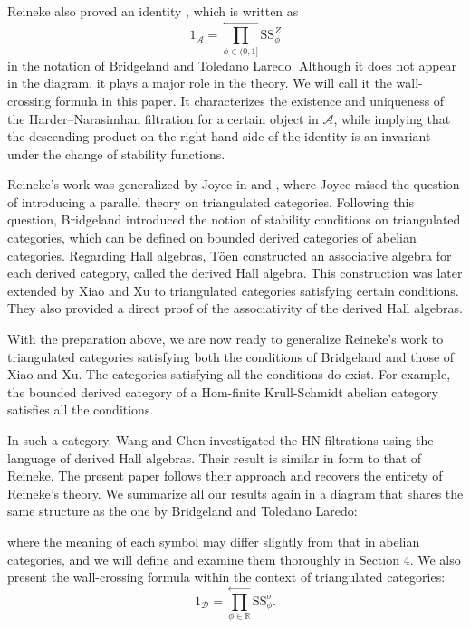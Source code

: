 \documentclass[a4paper,12pt]{amsart}
\newcommand{\Hom}{\mathrm{Hom}}
\newcommand{\Ss}{\mathrm{SS}}
\begin{document}
Reineke also proved an identity \cite[Proposition 4.12]{Rei2002}, which is written as
\[1_\mathcal{A}=\prod^\leftarrow_{\phi\in(0,1]}\Ss^Z_\phi\]
in the notation of Bridgeland and Toledano Laredo. Although it does not appear in the diagram, it plays a major role in the theory. We will call it the wall-crossing formula in this paper. It characterizes the existence and uniqueness of the Harder–Narasimhan filtration for a certain object in $\mathcal{A}$, while implying that the descending product on the right-hand side of the identity is an invariant under the change of stability functions.
    
    Reineke's work was generalized by Joyce in \cite{Joy2007'} and \cite{Joy2008}, where Joyce raised the question \cite[Problem 7.1]{Joy2008} of introducing a parallel theory on triangulated categories. Following this question, Bridgeland \cite{Bri2002} introduced the notion of stability conditions on triangulated categories, which can be defined on bounded derived categories of abelian categories. Regarding Hall algebras, T\"{o}en \cite{Toe2006} constructed an associative algebra for each derived category, called the derived Hall algebra. This construction was later extended by Xiao and Xu \cite{XX2006} to triangulated categories satisfying certain conditions. They also provided a direct proof of the associativity of the derived Hall algebras.

    With the preparation above, we are now ready to generalize Reineke's work to triangulated categories satisfying both the conditions of Bridgeland and those of Xiao and Xu. The categories satisfying all the conditions do exist. For example, the bounded derived category of a $\Hom$-finite Krull-Schmidt abelian category satisfies all the conditions.

    In such a category, Wang and Chen \cite{WC2023} investigated the HN filtrations  using the language of derived Hall algebras. Their result is similar in form to that of Reineke. The present paper follows their approach and recovers the entirety of Reineke's theory. We summarize all our results again in a diagram that shares the same structure as the one by Bridgeland and Toledano Laredo:
    \begin{center}
\end{center}
where the meaning of each symbol may differ slightly from that in abelian categories, and we will define and examine them thoroughly in Section 4. We also present the wall-crossing formula within the context of triangulated categories:
\[1_\mathcal{D}=\prod^\leftarrow_{\phi\in\mathbb{R}}\Ss^\sigma_\phi.\]
\end{document}
